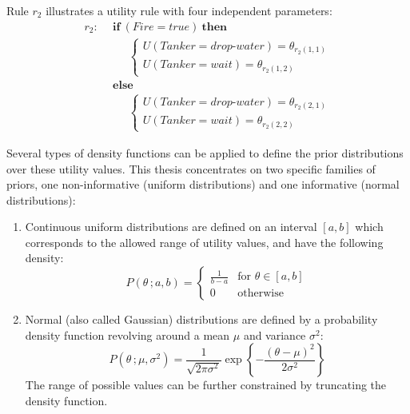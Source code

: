 Rule $r_{2}$ illustrates a utility rule with four independent parameters:
\begin{align*}
r_{2}: \ \ & \textbf{if} \ (\mathit{Fire}\!=\!\mathit{true}) \ \textbf{then} \\
& \;\;\;\;\;  \begin{cases}
U(\mathit{Tanker}\!=\!\mathit{drop\mbox{-}water}) = \theta_{r_{2}(1,1)} \\
U(\mathit{Tanker}\!=\!\mathit{wait}) = \theta_{r_{2}(1,2)}
\end{cases} \\
& \textbf{else} \\
& \;\;\;\;\; \begin{cases}
U (\mathit{Tanker}\!=\!\mathit{drop\mbox{-}water}) = \theta_{r_{2}(2,1)} \\
U(\mathit{Tanker}\!=\!\mathit{wait}) = \theta_{r_{2}(2,2)}
\end{cases}
\end{align*}

Several types of density functions can be applied to define the prior distributions over these utility values.  This thesis concentrates on two specific families of priors, one non-informative (uniform distributions) and one informative (normal distributions): 
\begin{enumerate}
\item Continuous uniform distributions are defined on an interval $[a,b]$ which corresponds to the allowed range of utility values, and have the following density:
\begin{equation}
P(\theta\,; a, b) = \begin{cases}
\frac{1}{b - a} & \text{for } \theta \in [a,b]  \\
0               & \text{otherwise}
\end{cases}
\end{equation}

\item Normal (also called Gaussian) distributions are defined by a probability density function revolving around a mean $\mu$ and variance $\sigma^2$:
\begin{equation}
P(\theta\,; \mu, \sigma^2) = \frac{1}{\sqrt{2\pi\sigma^2}}\operatorname{exp}\left\{-\frac{\left(\theta-\mu\right)^2}{2\sigma^2}\right\}
\end{equation}
The range of possible values can be further constrained by truncating the density function.

\end{enumerate}

